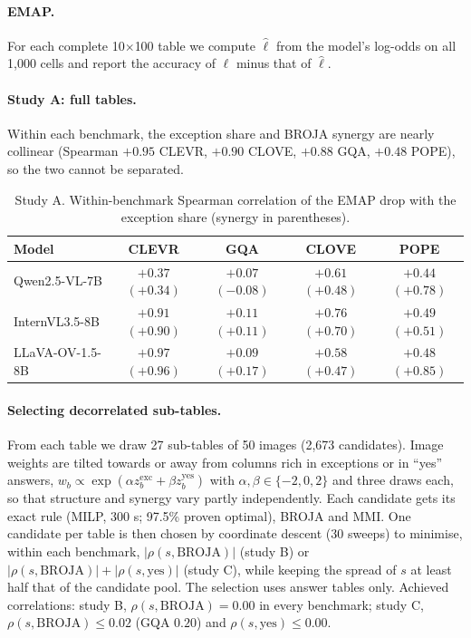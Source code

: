 \paragraph{EMAP.}
For each complete 10$\times$100 table we compute $\hat\ell$ from the model's log-odds on all
1{,}000 cells and report the accuracy of $\ell$ minus that of $\hat\ell$.

\paragraph{Study A: full tables.}
Within each benchmark, the exception share and BROJA synergy are nearly collinear (Spearman
$+0.95$ CLEVR, $+0.90$ CLOVE, $+0.88$ GQA, $+0.48$ POPE), so the two cannot be separated.

\begin{table}[h]
\centering\small\setlength{\tabcolsep}{3pt}
\caption{Study A. Within-benchmark Spearman correlation of the EMAP drop with the exception
share (synergy in parentheses).}
\begin{tabular}{lcccc}
\toprule
Model & CLEVR & GQA & CLOVE & POPE \\
\midrule
Qwen2.5-VL-7B   & $+0.37$ $(+0.34)$ & $+0.07$ $(-0.08)$ & $+0.61$ $(+0.48)$ & $+0.44$ $(+0.78)$ \\
InternVL3.5-8B  & $+0.91$ $(+0.90)$ & $+0.11$ $(+0.11)$ & $+0.76$ $(+0.70)$ & $+0.49$ $(+0.51)$ \\
LLaVA-OV-1.5-8B & $+0.97$ $(+0.96)$ & $+0.09$ $(+0.17)$ & $+0.58$ $(+0.47)$ & $+0.48$ $(+0.85)$ \\
\bottomrule
\end{tabular}
\end{table}

\paragraph{Selecting decorrelated sub-tables.}
From each table we draw 27 sub-tables of 50 images (2{,}673 candidates). Image weights are
tilted towards or away from columns rich in exceptions or in ``yes'' answers,
$w_b\propto\exp(\alpha z_b^{\mathrm{exc}}+\beta z_b^{\mathrm{yes}})$ with
$\alpha,\beta\in\{-2,0,2\}$ and three draws each, so that structure and synergy vary partly
independently. Each candidate gets its exact rule (MILP, 300 s; 97.5\% proven optimal), BROJA
and MMI. One candidate per table is then chosen by coordinate descent (30 sweeps) to minimise,
within each benchmark, $|\rho(s,\mathrm{BROJA})|$ (study B) or
$|\rho(s,\mathrm{BROJA})|+|\rho(s,\mathrm{yes})|$ (study C), while keeping the spread of $s$ at
least half that of the candidate pool. The selection uses answer tables only. Achieved
correlations: study B, $\rho(s,\mathrm{BROJA})=0.00$ in every benchmark; study C,
$\rho(s,\mathrm{BROJA})\le 0.02$ (GQA $0.20$) and $\rho(s,\mathrm{yes})\le 0.00$.

